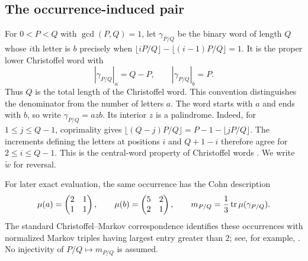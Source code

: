 \subsection{The occurrence-induced pair}

For $0<P<Q$ with $\gcd(P,Q)=1$, let $\gamma_{P/Q}$ be the binary
word of length $Q$ whose $i$th letter is $b$ precisely when
$\lfloor iP/Q\rfloor-\lfloor(i-1)P/Q\rfloor=1$.
It is the proper lower Christoffel word with
\begin{equation}\label{eq:farey-counts}
 |\gamma_{P/Q}|_a=Q-P,\qquad |\gamma_{P/Q}|_b=P.
\end{equation}
Thus $Q$ is the total length of the Christoffel word. This convention
distinguishes the denominator from the number of letters $a$.
The word starts with $a$ and ends with $b$, so write
$\gamma_{P/Q}=azb$. Its interior $z$ is a palindrome.
Indeed, for $1\leqslant j\leqslant Q-1$, coprimality gives
$\lfloor(Q-j)P/Q\rfloor=P-1-\lfloor jP/Q\rfloor$.
The increments defining the letters at positions $i$ and $Q+1-i$
therefore agree for $2\leqslant i\leqslant Q-1$.
This is the central-word property of Christoffel words
\cite{BertheDeLucaReutenauer2008}. We write $\widetilde w$ for reversal.

For later exact evaluation, the same occurrence has the Cohn description
\begin{equation}\label{eq:cohn-source}
 \mu(a)=\begin{pmatrix}2&1\\1&1\end{pmatrix},\qquad
 \mu(b)=\begin{pmatrix}5&2\\2&1\end{pmatrix},\qquad
 m_{P/Q}=\frac13\operatorname{tr}\mu(\gamma_{P/Q}).
\end{equation}
The standard Christoffel--Markov correspondence identifies these
occurrences with normalized Markov triples having largest entry greater
than $2$; see, for example,
\cite[Theorem~1 and its proof]{ReutenauerVuillon2017}.
No injectivity of $P/Q\mapsto m_{P/Q}$ is assumed.

